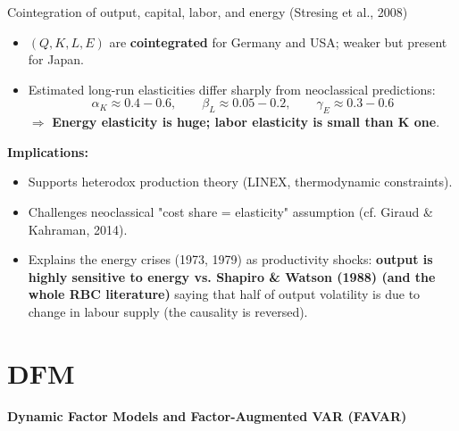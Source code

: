 \documentclass{beamer}
\begin{document}
\begin{frame}{Cointegration of output, capital, labor, and energy (Stresing et al., 2008)}
\small

\begin{itemize}
  \item $(Q,K,L,E)$ are \textbf{cointegrated} for Germany and USA; weaker but present for Japan.
  \item Estimated long-run elasticities differ sharply from neoclassical predictions:
  \[
    \alpha_K \approx 0.4\!-\!0.6,\qquad
    \beta_L \approx 0.05\!-\!0.2,\qquad
    \gamma_E \approx 0.3\!-\!0.6
  \]
  $\Rightarrow$ \textbf{Energy elasticity is huge; labor elasticity is small than K one}.
\end{itemize}

\textbf{Implications:}
\begin{itemize}
  \item Supports heterodox production theory (LINEX, thermodynamic constraints).
  \item Challenges neoclassical "cost share = elasticity" assumption (cf. Giraud \& Kahraman, 2014).
  \item Explains the energy crises (1973, 1979) as productivity shocks:\textbf{ output is highly sensitive to energy vs. Shapiro \& Watson (1988) (and the whole RBC literature)} saying that half of output volatility is due to change in labour supply (the causality is reversed).
\end{itemize}
\end{frame}
















\section{DFM}


\begin{frame}
  \centering
  \vfill
  {\LARGE \textbf{Dynamic Factor Models and Factor-Augmented VAR (FAVAR)}}\\[0.4cm]
  \vfill
\end{frame}
\end{document}
